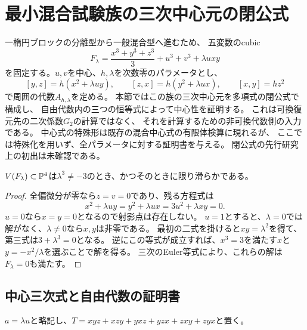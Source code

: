 \section{最小混合試験族の三次中心元の閉公式}
\label{mt:sec:family}

一楕円ブロックの分離型から一般混合型へ進むため、
五変数のcubic
\begin{equation}\label{mt:eq:classical}
 F_\lambda=\frac{x^3+y^3+z^3}{3}+u^3+v^3+\lambda uxy
\end{equation}
を固定する。$u,v$を中心、$h,\lambda$を次数零のパラメータとし、
\begin{equation}\label{mt:eq:relations}
 [y,z]=h(x^2+\lambda uy),\qquad
 [z,x]=h(y^2+\lambda ux),\qquad
 [x,y]=hz^2
\end{equation}
で周囲の代数$A_{h,\lambda}$を定める。
本節ではこの族の三次中心元を多項式の閉公式で構成し、
自由代数内の三つの恒等式によって中心性を証明する。
これは可換復元先の二次係数$G_2$の計算ではなく、
それを計算するための非可換代数側の入力である。
中心式の特殊形は既存の混合中心式の有限体検算に現れるが、
ここでは特殊化を用いず、全パラメータに対する証明書を与える。
閉公式の先行研究上の初出は未確認である。

\begin{lemma}[古典特殊ファイバーの滑らかさ]
\label{mt:lem:classical-smooth}
$V(F_\lambda)\subset\mathbb P^4$は$\lambda^3\ne-3$のとき、かつそのときに限り滑らかである。
\end{lemma}
\begin{proof}
全偏微分が零なら$z=v=0$であり、残る方程式は
\[
 x^2+\lambda uy=y^2+\lambda ux=3u^2+\lambda xy=0.
\]
$u=0$なら$x=y=0$となるので射影点は存在しない。
$u=1$とすると、$\lambda=0$では解がなく、$\lambda\ne0$なら$x,y$は非零である。
最初の二式を掛けると$xy=\lambda^2$を得て、第三式は$3+\lambda^3=0$となる。
逆にこの等式が成立すれば、$x^3=3$を満たす$x$と
$y=-x^2/\lambda$を選ぶことで解を得る。
三次のEuler等式により、これらの解は$F_\lambda=0$も満たす。
\end{proof}

\subsection{中心三次式と自由代数の証明書}

$a=\lambda u$と略記し、$T=xyz+xzy+yxz+yzx+zxy+zyx$と置く。

